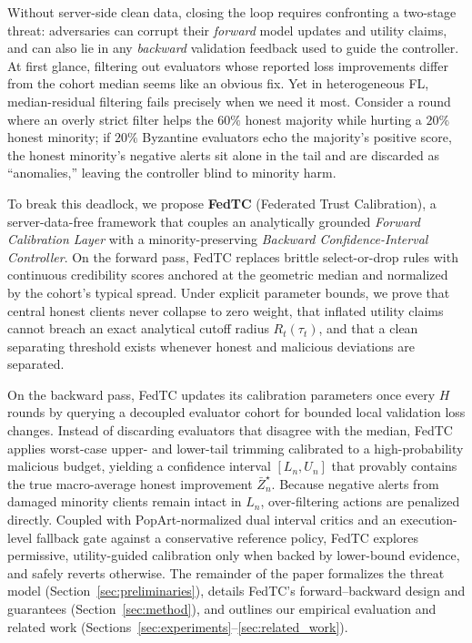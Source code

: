 Without server-side clean data, closing the loop requires confronting a two-stage threat: adversaries can corrupt their \emph{forward} model updates and utility claims, and can also lie in any \emph{backward} validation feedback used to guide the controller. At first glance, filtering out evaluators whose reported loss improvements differ from the cohort median seems like an obvious fix. Yet in heterogeneous FL, median-residual filtering fails precisely when we need it most. Consider a round where an overly strict filter helps the $60\%$ honest majority while hurting a $20\%$ honest minority; if $20\%$ Byzantine evaluators echo the majority's positive score, the honest minority's negative alerts sit alone in the tail and are discarded as ``anomalies,'' leaving the controller blind to minority harm.

To break this deadlock, we propose \textbf{FedTC} (Federated Trust Calibration), a server-data-free framework that couples an analytically grounded \emph{Forward Calibration Layer} with a minority-preserving \emph{Backward Confidence-Interval Controller}. On the forward pass, FedTC replaces brittle select-or-drop rules with continuous credibility scores anchored at the geometric median and normalized by the cohort's typical spread. Under explicit parameter bounds, we prove that central honest clients never collapse to zero weight, that inflated utility claims cannot breach an exact analytical cutoff radius $R_t(\tau_t)$, and that a clean separating threshold exists whenever honest and malicious deviations are separated.

On the backward pass, FedTC updates its calibration parameters once every $H$ rounds by querying a decoupled evaluator cohort for bounded local validation loss changes. Instead of discarding evaluators that disagree with the median, FedTC applies worst-case upper- and lower-tail trimming calibrated to a high-probability malicious budget, yielding a confidence interval $[L_n, U_n]$ that provably contains the true macro-average honest improvement $\bar{Z}_n^\star$. Because negative alerts from damaged minority clients remain intact in $L_n$, over-filtering actions are penalized directly. Coupled with PopArt-normalized dual interval critics and an execution-level fallback gate against a conservative reference policy, FedTC explores permissive, utility-guided calibration only when backed by lower-bound evidence, and safely reverts otherwise. The remainder of the paper formalizes the threat model (Section~\ref{sec:preliminaries}), details FedTC's forward--backward design and guarantees (Section~\ref{sec:method}), and outlines our empirical evaluation and related work (Sections~\ref{sec:experiments}--\ref{sec:related_work}).
